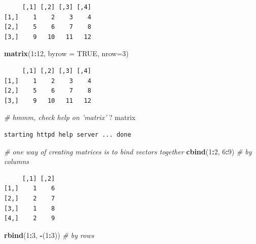 \documentclass[
]{book}
\newenvironment{Shaded}{\begin{snugshade}}{\end{snugshade}}
\newcommand{\CommentTok}[1]{\textcolor[rgb]{0.56,0.35,0.01}{\textit{#1}}}
\newcommand{\DataTypeTok}[1]{\textcolor[rgb]{0.13,0.29,0.53}{#1}}
\newcommand{\DecValTok}[1]{\textcolor[rgb]{0.00,0.00,0.81}{#1}}
\newcommand{\KeywordTok}[1]{\textcolor[rgb]{0.13,0.29,0.53}{\textbf{#1}}}
\newcommand{\NormalTok}[1]{#1}
\newcommand{\OperatorTok}[1]{\textcolor[rgb]{0.81,0.36,0.00}{\textbf{#1}}}
\newcommand{\OtherTok}[1]{\textcolor[rgb]{0.56,0.35,0.01}{#1}}
\begin{document}
\begin{verbatim}
     [,1] [,2] [,3] [,4]
[1,]    1    2    3    4
[2,]    5    6    7    8
[3,]    9   10   11   12
\end{verbatim}

\begin{Shaded}
\begin{Highlighting}[]
\KeywordTok{matrix}\NormalTok{(}\DecValTok{1}\OperatorTok{:}\DecValTok{12}\NormalTok{, }\DataTypeTok{byrow =} \OtherTok{TRUE}\NormalTok{, }\DataTypeTok{nrow=}\DecValTok{3}\NormalTok{)}
\end{Highlighting}
\end{Shaded}

\begin{verbatim}
     [,1] [,2] [,3] [,4]
[1,]    1    2    3    4
[2,]    5    6    7    8
[3,]    9   10   11   12
\end{verbatim}

\begin{Shaded}
\begin{Highlighting}[]
\CommentTok{# hmmm, check help on 'matrix'}
\NormalTok{? matrix}
\end{Highlighting}
\end{Shaded}

\begin{verbatim}
starting httpd help server ... done
\end{verbatim}

\begin{Shaded}
\begin{Highlighting}[]
\CommentTok{# one way of creating matrices is to bind vectors together}
\KeywordTok{cbind}\NormalTok{(}\DecValTok{1}\OperatorTok{:}\DecValTok{2}\NormalTok{, }\DecValTok{6}\OperatorTok{:}\DecValTok{9}\NormalTok{)     }\CommentTok{# by columns}
\end{Highlighting}
\end{Shaded}

\begin{verbatim}
     [,1] [,2]
[1,]    1    6
[2,]    2    7
[3,]    1    8
[4,]    2    9
\end{verbatim}

\begin{Shaded}
\begin{Highlighting}[]
\KeywordTok{rbind}\NormalTok{(}\DecValTok{1}\OperatorTok{:}\DecValTok{3}\NormalTok{, }\OperatorTok{-}\NormalTok{(}\DecValTok{1}\OperatorTok{:}\DecValTok{3}\NormalTok{))  }\CommentTok{# by rows}
\end{Highlighting}
\end{Shaded}
\end{document}
